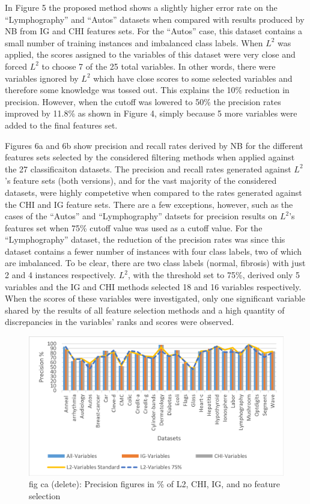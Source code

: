 \documentclass[review]{elsarticle}
\begin{document}
In Figure 5 the proposed method shows a slightly higher error rate on the “Lymphography” and “Autos” datasets when compared with results produced by NB from IG and CHI features sets. For the “Autos” case, this dataset contains a small number of training instances and imbalanced class labels. When $ L^2 $ was applied, the scores assigned to the variables of this dataset were very close and forced $ L^2 $ to choose 7 of the 25 total variables. In other words, there were variables ignored by $ L^2 $ which have close scores to some selected variables and therefore some knowledge was tossed out. This explains the 10\% reduction in precision. However, when the cutoff was lowered to 50\% the precision rates improved by 11.8\% as shown in Figure 4, simply because 5 more variables were added to the final features set. 

Figures 6a and 6b show precision and recall rates derived by NB for the different features sets selected by the considered filtering methods when applied against the 27 classificaiton datasets. The precision and recall rates generated against $ L^2 $’s feature sets (both versions), and for the vast majority of the considered datasets, were highly competetive when compared to the rates generated against the CHI and IG feature sets. There are a few exceptions, however,  such as the cases of the “Autos” and “Lymphography” datsets for precision results on $ L^2 $’s features set when 75\% cutoff value was used as a cutoff value. For the “Lymphography” dataset, the reduction of the precision rates was since this dataset contains a fewer number of instances with four class labels, two of which are imbalanced. To be clear, there are two class labels (normal, fibrosis) with just 2 and 4 instances respectively. $ L^2 $, with the threshold set to 75\%, derived only 5 variables and the IG and CHI methods selected 18 and 16 variables respectively. When the scores of these variables were investigated, only one significant variable shared by the results of all feature selection methods and a high quantity of discrepancies in the variables’ ranks and scores were observed. 


\begin{figure}[h]
	\centering
	\includegraphics[width=0.8\linewidth]{figs/fig_6a_precision_75.png}
	\caption[fig-6a-precision-75]{ fig ca (delete): Precision figures in \% of L2, CHI, IG, and no feature selection  }
	\label{fig:fig-6a-precision-75}
\end{figure}
\end{document}
